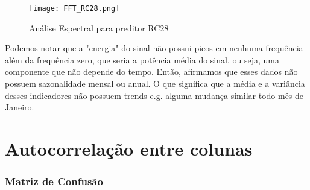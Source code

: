 \begin{figure}[H]
\centering
\texttt{[image: FFT\_RC28.png]}
\caption{Análise Espectral para preditor RC28}
\end{figure}


Podemos notar que a "energia" do sinal não possui picos em nenhuma frequência além da frequência zero, que seria a potência média do sinal, ou seja, uma componente que não depende do tempo. Então, afirmamos que esses dados não possuem sazonalidade mensal ou anual. O que significa que a média e a variância desses indicadores não possuem trends e.g. alguma mudança similar todo mês de Janeiro.


\section{Autocorrelação entre colunas}

\subsubsection{Matriz de Confusão}
